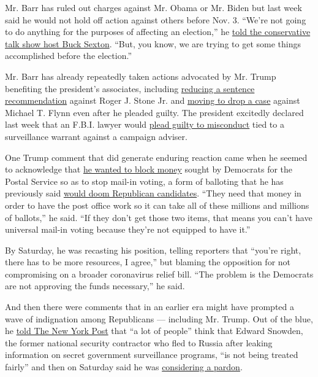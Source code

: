 Mr. Barr has ruled out charges against Mr. Obama or Mr. Biden but last
week said he would not hold off action against others before Nov. 3.
``We're not going to do anything for the purposes of affecting an
election,'' he
\href{https://www.bucksexton.com/content/2020-08-12-barr-says-its-the-first-time-in-his-career-dems-dont-condemn-violence/}{told
the conservative talk show host Buck Sexton}. ``But, you know, we are
trying to get some things accomplished before the election.''

Mr. Barr has already repeatedly taken actions advocated by Mr. Trump
benefiting the president's associates, including
\href{https://www.nytimes3xbfgragh.onion/2020/02/11/us/politics/roger-stone-sentencing.html}{reducing
a sentence recommendation} against Roger J. Stone Jr. and
\href{https://www.nytimes3xbfgragh.onion/2020/05/07/us/politics/michael-flynn-case-dropped.html}{moving
to drop a case} against Michael T. Flynn even after he pleaded guilty.
The president excitedly declared last week that an F.B.I. lawyer would
\href{https://www.nytimes3xbfgragh.onion/2020/08/14/us/politics/kevin-clinesmith-durham-investigation.html}{plead
guilty to misconduct} tied to a surveillance warrant against a campaign
adviser.

One Trump comment that did generate enduring reaction came when he
seemed to acknowledge that
\href{https://www.nytimes3xbfgragh.onion/2020/08/13/us/politics/trump-postal-service-mail-voting.html}{he
wanted to block money} sought by Democrats for the Postal Service so as
to stop mail-in voting, a form of balloting that he has previously said
\href{https://www.nytimes3xbfgragh.onion/2020/04/10/us/politics/vote-by-mail.html}{would
doom Republican candidates}. ``They need that money in order to have the
post office work so it can take all of these millions and millions of
ballots,'' he said. ``If they don't get those two items, that means you
can't have universal mail-in voting because they're not equipped to have
it.''

By Saturday, he was recasting his position, telling reporters that
``you're right, there has to be more resources, I agree,'' but blaming
the opposition for not compromising on a broader coronavirus relief
bill. ``The problem is the Democrats are not approving the funds
necessary,'' he said.

And then there were comments that in an earlier era might have prompted
a wave of indignation among Republicans --- including Mr. Trump. Out of
the blue, he
\href{https://nypost.com/2020/08/13/trump-a-lot-of-people-think-edward-snowden-not-being-treated-fairly/}{told
The New York Post} that ``a lot of people'' think that Edward Snowden,
the former national security contractor who fled to Russia after leaking
information on secret government surveillance programs, ``is not being
treated fairly'' and then on Saturday said he was
\href{https://www.nytimes3xbfgragh.onion/2020/08/15/us/politics/trump-snowden-esper.html}{considering
a pardon}.

